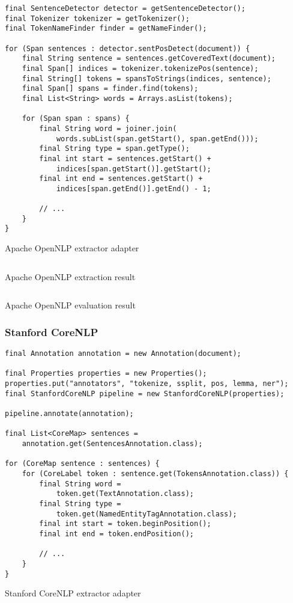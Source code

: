 \begin{listing}[H]
\begin{verbatim}
final SentenceDetector detector = getSentenceDetector();
final Tokenizer tokenizer = getTokenizer();
final TokenNameFinder finder = getNameFinder();

for (Span sentences : detector.sentPosDetect(document)) {
    final String sentence = sentences.getCoveredText(document);
    final Span[] indices = tokenizer.tokenizePos(sentence);
    final String[] tokens = spansToStrings(indices, sentence);
    final Span[] spans = finder.find(tokens);
    final List<String> words = Arrays.asList(tokens);

    for (Span span : spans) {
        final String word = joiner.join(
            words.subList(span.getStart(), span.getEnd()));
        final String type = span.getType();
        final int start = sentences.getStart() + 
            indices[span.getStart()].getStart();
        final int end = sentences.getStart() + 
            indices[span.getEnd()].getEnd() - 1;

        // ...
    }
}
\end{verbatim}
\caption{Apache OpenNLP extractor adapter}
\label{lst:opennlp-adapter}
\end{listing}

\begin{listing}[H]
\inputminted{xml}{opennlp.xml}
\caption{Apache OpenNLP extraction result}
\label{lst:opennlp-result}
\end{listing}

\begin{listing}[H]
\inputminted{java}{opennlp.txt}
\caption{Apache OpenNLP evaluation result}
\end{listing}

\newpage
\subsubsection{Stanford CoreNLP}

\begin{listing}[H]
\begin{verbatim}
final Annotation annotation = new Annotation(document);

final Properties properties = new Properties();
properties.put("annotators", "tokenize, ssplit, pos, lemma, ner");
final StanfordCoreNLP pipeline = new StanfordCoreNLP(properties);

pipeline.annotate(annotation);

final List<CoreMap> sentences = 
    annotation.get(SentencesAnnotation.class);

for (CoreMap sentence : sentences) {
    for (CoreLabel token : sentence.get(TokensAnnotation.class)) {
        final String word = 
            token.get(TextAnnotation.class);
        final String type = 
            token.get(NamedEntityTagAnnotation.class);
        final int start = token.beginPosition();
        final int end = token.endPosition();

        // ...
    }
}
\end{verbatim}
\caption{Stanford CoreNLP extractor adapter}
\label{lst:corenlp-adapter}
\end{listing}

